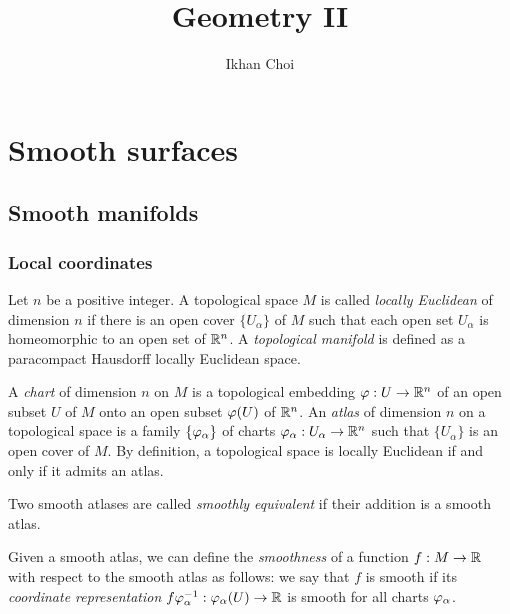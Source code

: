 \documentclass{../../large}
\begin{document}
\title{Geometry II}
\author{Ikhan Choi}
\maketitle
\tableofcontents





\part{Smooth surfaces}

\chapter{Smooth manifolds}
\section{Local coordinates}

\begin{prb}
Let $n$ be a positive integer.
A topological space $M$ is called \emph{locally Euclidean} of dimension $n$ if there is an open cover $\{U_\alpha\}$ of $M$ such that each open set $U_\alpha$ is homeomorphic to an open set of $\mathbb{R}^n$.
A \emph{topological manifold} is defined as a paracompact Hausdorff locally Euclidean space.

A \emph{chart} of dimension $n$ on $M$ is a topological embedding $\varphi:U\to\mathbb{R}^n$ of an open subset $U$ of $M$ onto an open subset $\varphi(U)$ of $\mathbb{R}^n$.
An \emph{atlas} of dimension $n$ on a topological space is a family $\{\varphi_\alpha\}$ of charts $\varphi_\alpha:U_\alpha\to\mathbb{R}^n$ such that $\{U_\alpha\}$ is an open cover of $M$.
By definition, a topological space is locally Euclidean if and only if it admits an atlas.

Two smooth atlases are called \emph{smoothly equivalent} if their addition is a smooth atlas.
\end{prb}

Given a smooth atlas, we can define the \emph{smoothness} of a function $f:M\to\mathbb{R}$ with respect to the smooth atlas as follows: we say that $f$ is smooth if its \emph{coordinate representation} $f\varphi_\alpha^{-1}:\varphi_\alpha(U)\to\mathbb{R}$ is smooth for all charts $\varphi_\alpha$.
\end{document}
